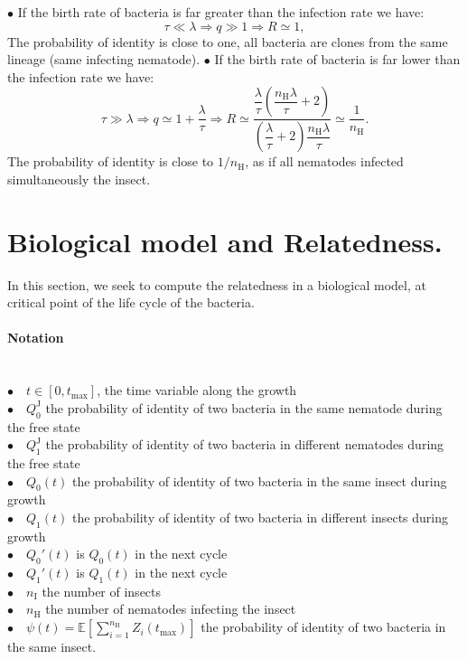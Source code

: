 \documentclass{article}
\newcommand{\nN}{{n_\textrm{H}}}
\newcommand{\nI}{{n_\textrm{I}}}
\begin{document}
 $\bullet$ If the birth rate of bacteria is far greater than the infection rate we have:
 \begin{equation}
 \tau \ll \lambda \Rightarrow q \gg 1 \Rightarrow R \simeq 1,
 \end{equation}
 The probability of identity is close to one, all bacteria are clones from the same lineage (same infecting nematode).
 $\bullet$ If the birth rate of bacteria is far lower than the infection rate we have:
 \begin{equation}
 \tau \gg \lambda \Rightarrow q \simeq 1 + \frac{\lambda }{\tau } \Rightarrow R \simeq 
  \dfrac{\dfrac{\lambda}{\tau}\left( \dfrac{\nN\lambda}{\tau} +2\right)}{\left( \dfrac{\lambda}{\tau} +2\right)\dfrac{\nN\lambda}{\tau}} \simeq \dfrac{1}{\nN}.
 \end{equation}
 The probability of identity is close to $1/ \nN$, as if all nematodes infected simultaneously the insect.
\section{Biological model and Relatedness.}
\label{section_life_cycle}
In this section, we seek to compute the relatedness in a biological model, at critical point of the life cycle of the bacteria.
 \paragraph{Notation} $ $\\
 $\bullet \quad t \in [0, t_{\mathrm{max}}]$, the time variable along the growth\\
 $\bullet \quad Q_0^{\mathrm{J}}$ the probability of identity of two bacteria in the same nematode during the free state\\
 $\bullet \quad Q_1^{\mathrm{J}}$ the probability of identity of two bacteria in different nematodes during the free state\\
 $\bullet \quad Q_0(t)$ the probability of identity of two bacteria in the same insect during growth\\
 $\bullet \quad Q_1(t)$ the probability of identity of two bacteria in different insects during growth\\
 $\bullet \quad Q_0'(t)$ is $Q_0(t)$ in the next cycle\\
 $\bullet \quad Q_1'(t)$ is $Q_1(t)$ in the next cycle\\
 $\bullet \quad \nI$ the number of insects\\
 $\bullet \quad \nN $ the number of nematodes infecting the insect\\
 $\bullet \quad \psi(t)={\mathbb E} \left[ \displaystyle  \sum_{i=1}^\nN  Z_i (t_{\mathrm{max}}) \right]$ the probability of identity of two bacteria in the same insect.
 
\end{document}
